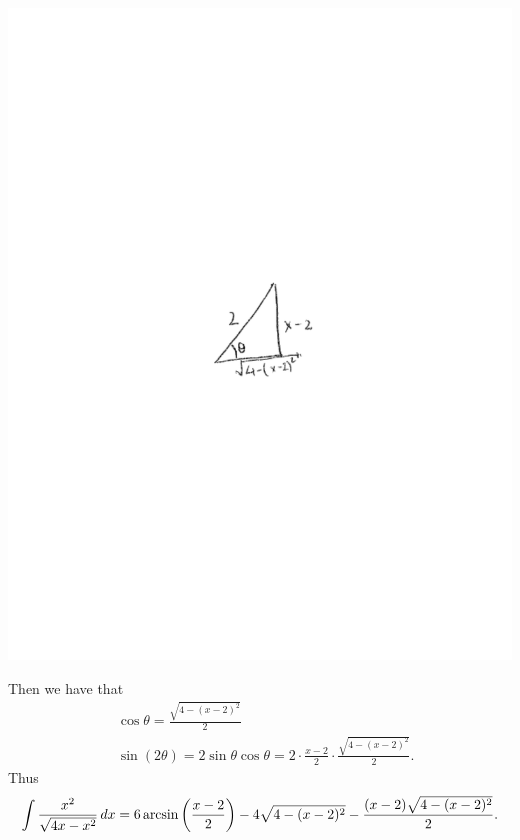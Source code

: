 \documentclass[]{ximera}
\begin{document}
\begin{problem}
\begin{freeResponse}
		\begin{image}
		\includegraphics[trim= 270 350 250 330]{Figure7-4-2.pdf}
		\end{image}
		
	Then we have that
		\begin{align*}
		&\cos \theta = \frac{\sqrt{4-(x-2)^2}}{2}  \\
		&\sin(2\theta) = 2 \sin \theta \cos \theta = 2 \cdot \frac{x-2}{2} \cdot \frac{\sqrt{4-(x-2)^2}}{2}.
		\end{align*}
	Thus
		\[
		\int \frac{x^2}{\sqrt{4x-x^2}} \,d x = 6\arcsin \left( \frac{x-2}{2} \right) - 4\sqrt{4-(x-2)^2} - \frac{(x-2)\sqrt{4-(x-2)^2}}{2}.
		\]
	\end{freeResponse}

\end{problem}

\begin{instructorNotes}

\end{instructorNotes}
\end{document}

